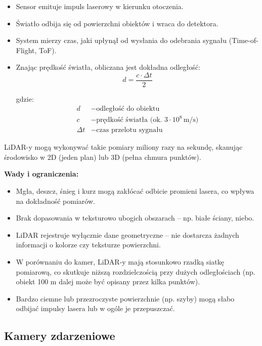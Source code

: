 \documentclass[magisterska]{pracadypl}
\begin{document}
\begin{itemize}
  \item Sensor emituje impuls laserowy w kierunku otoczenia.
  \item Światło odbija się od powierzchni obiektów i wraca do detektora.
  \item System mierzy czas, jaki upłynął od wysłania do odebrania sygnału (Time-of-Flight, ToF).
  \item Znając prędkość światła, obliczana jest dokładna odległość:
    \[
    d = \frac{c \cdot \Delta t}{2}
    \]

  gdzie:
  \begin{align*}
  d &- \text{odległość do obiektu} \\
  c &- \text{prędkość światła (ok. } 3 \cdot 10^8 \, \text{m/s)} \\
  \Delta t &- \text{czas przelotu sygnału}
  \end{align*} 
\end{itemize}

LiDAR-y mogą wykonywać takie pomiary miliony razy na sekundę, skanując środowisko w 2D (jeden plan) lub 3D (pełna chmura punktów).

\begin{minipage}[t]{\textwidth}
\textbf{Wady i ograniczenia:}
\begin{itemize}
  \item Mgła, deszcz, śnieg i kurz mogą zakłócać odbicie promieni lasera, co wpływa na dokładność pomiarów.

  \item Brak dopasowania w teksturowo ubogich obszarach – np. białe ściany, niebo.

  \item LiDAR rejestruje wyłącznie dane geometryczne – nie dostarcza żadnych informacji o kolorze czy teksturze powierzchni.

  \item W porównaniu do kamer, LiDAR-y mają stosunkowo rzadką siatkę pomiarową, co skutkuje niższą rozdzielczością przy dużych odległościach (np. obiekt 100 m dalej może być opisany przez kilka punktów).

  \item Bardzo ciemne lub przezroczyste powierzchnie (np. szyby) mogą słabo odbijać impulsy lasera lub w ogóle je przepuszczać.
\end{itemize}
\end{minipage}

\subsection{Kamery zdarzeniowe}
\end{document}
